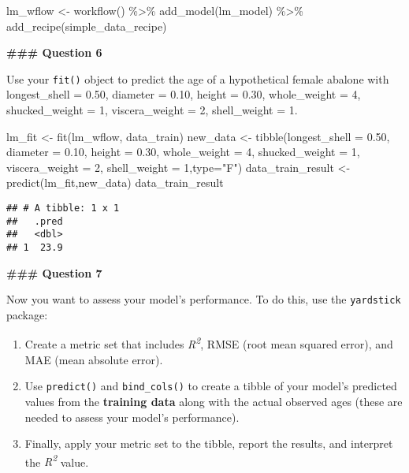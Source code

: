 \documentclass[
]{article}
\newenvironment{Shaded}{\begin{snugshade}}{\end{snugshade}}
\newcommand{\AttributeTok}[1]{\textcolor[rgb]{0.77,0.63,0.00}{#1}}
\newcommand{\DecValTok}[1]{\textcolor[rgb]{0.00,0.00,0.81}{#1}}
\newcommand{\FloatTok}[1]{\textcolor[rgb]{0.00,0.00,0.81}{#1}}
\newcommand{\FunctionTok}[1]{\textcolor[rgb]{0.00,0.00,0.00}{#1}}
\newcommand{\NormalTok}[1]{#1}
\newcommand{\OtherTok}[1]{\textcolor[rgb]{0.56,0.35,0.01}{#1}}
\newcommand{\SpecialCharTok}[1]{\textcolor[rgb]{0.00,0.00,0.00}{#1}}
\newcommand{\StringTok}[1]{\textcolor[rgb]{0.31,0.60,0.02}{#1}}
\providecommand{\tightlist}{%
  \setlength{\itemsep}{0pt}\setlength{\parskip}{0pt}}
\begin{document}
\begin{Shaded}
\begin{Highlighting}[]
\NormalTok{lm\_wflow }\OtherTok{\textless{}{-}} \FunctionTok{workflow}\NormalTok{() }\SpecialCharTok{\%\textgreater{}\%} 
  \FunctionTok{add\_model}\NormalTok{(lm\_model) }\SpecialCharTok{\%\textgreater{}\%} 
  \FunctionTok{add\_recipe}\NormalTok{(simple\_data\_recipe)}
\end{Highlighting}
\end{Shaded}

\textbf{\#\#\# Question 6}

Use your \texttt{fit()} object to predict the age of a hypothetical
female abalone with longest\_shell = 0.50, diameter = 0.10, height =
0.30, whole\_weight = 4, shucked\_weight = 1, viscera\_weight = 2,
shell\_weight = 1.

\begin{Shaded}
\begin{Highlighting}[]
\NormalTok{lm\_fit }\OtherTok{\textless{}{-}} \FunctionTok{fit}\NormalTok{(lm\_wflow, data\_train)}
\NormalTok{new\_data }\OtherTok{\textless{}{-}} \FunctionTok{tibble}\NormalTok{(}\AttributeTok{longest\_shell =} \FloatTok{0.50}\NormalTok{, }\AttributeTok{diameter =} \FloatTok{0.10}\NormalTok{, }\AttributeTok{height =} \FloatTok{0.30}\NormalTok{, }\AttributeTok{whole\_weight =} \DecValTok{4}\NormalTok{, }\AttributeTok{shucked\_weight =} \DecValTok{1}\NormalTok{, }\AttributeTok{viscera\_weight =} \DecValTok{2}\NormalTok{, }\AttributeTok{shell\_weight =} \DecValTok{1}\NormalTok{,}\AttributeTok{type=}\StringTok{"F"}\NormalTok{)}
\NormalTok{data\_train\_result }\OtherTok{\textless{}{-}} \FunctionTok{predict}\NormalTok{(lm\_fit,new\_data)}
\NormalTok{data\_train\_result }
\end{Highlighting}
\end{Shaded}

\begin{verbatim}
## # A tibble: 1 x 1
##   .pred
##   <dbl>
## 1  23.9
\end{verbatim}

\textbf{\#\#\# Question 7}

Now you want to assess your model's performance. To do this, use the
\texttt{yardstick} package:

\begin{enumerate}
\def\labelenumi{\arabic{enumi}.}
\tightlist
\item
  Create a metric set that includes \emph{R\textsuperscript{2}}, RMSE
  (root mean squared error), and MAE (mean absolute error).
\item
  Use \texttt{predict()} and \texttt{bind\_cols()} to create a tibble of
  your model's predicted values from the \textbf{training data} along
  with the actual observed ages (these are needed to assess your model's
  performance).
\item
  Finally, apply your metric set to the tibble, report the results, and
  interpret the \emph{R\textsuperscript{2}} value.
\end{enumerate}
\end{document}

